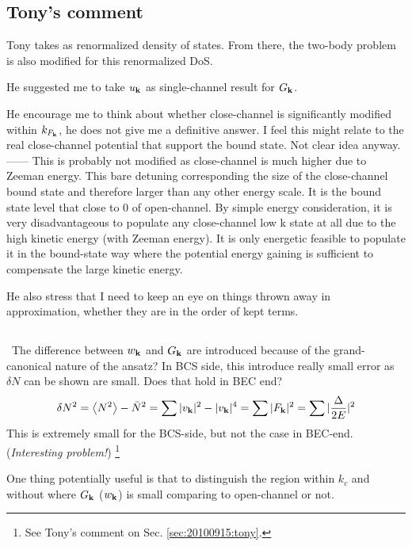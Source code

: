 \subsection{Tony's comment}
Tony takes  as renormalized density of states.  From there, the two-body problem is also modified for this renormalized DoS. 

He suggested me to take $u_{\mathbf{k}}$ as single-channel result for $G_{\mathbf{k}}$.   

He encourage me to think about whether close-channel is significantly modified within $k_{F_{\mathbf{k}}}$, he does not give me a definitive answer.  I feel this might relate to the real close-channel potential that support the bound state.  Not clear idea anyway.  
------ This is probably not modified as close-channel is much higher due to Zeeman energy.  This bare detuning corresponding the size of the close-channel bound state and therefore larger than any other energy scale.   It is the bound state level that close to 0 of open-channel.  By simple energy consideration, it is very disadvantageous to populate any close-channel low k state at all due to the high kinetic energy (with Zeeman energy).  It is only energetic feasible to populate it in the bound-state way where the potential energy gaining is sufficient to compensate the large kinetic energy.  

He also stress that I need to keep an eye on things thrown away in approximation,  whether they are in the order of kept terms.  

\subsection{\label{sec:20100915:deltaN}}\
The difference between $w_{\mathbf{k}}$ and $G_{\mathbf{k}}$ are introduced because of the grand-canonical nature of the ansatz?  In BCS side, this introduce really small error as $\delta{N}$ can be shown are small.  Does that hold in BEC end?
\begin{equation}
\delta{N}^{2}=\bigl<{N^{2}}\bigr>-\bar{N}^{2}=\sum{\ensuremath{\lvert{v_{\ensuremath{\mathbf{k}}}}\rvert}^{2}-\ensuremath{\lvert{v_{\ensuremath{\mathbf{k}}}}\rvert}^{4}}=\sum{\ensuremath{\lvert{F_{\ensuremath{\mathbf{k}}}}\rvert}^{2}}
	=\sum{\ensuremath{\lvert{\frac{\Delta}{2E}}\rvert}^{2}}
\end{equation}
This is extremely small for the BCS-side, but not the case in BEC-end.  (\emph{Interesting problem!})  \footnote{See Tony's comment on Sec. \ref{sec:20100915:tony}.}


One thing potentially useful is that to distinguish the region within $k_{c}$ and without where $G_{\mathbf{k}}$ ($w_{\mathbf{k}}$) is small comparing to open-channel or not.


